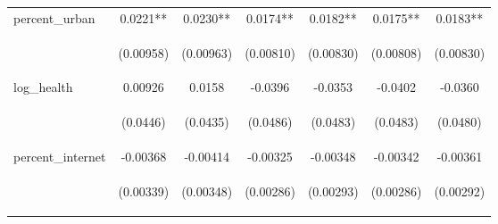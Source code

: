 \documentclass{article}
\begin{document}
\begin{table}[htbp]
{\begin{tabular}{lcccccc}
percent\_urban & 0.0221** & 0.0230** & 0.0174** & 0.0182** & 0.0175** & 0.0183** \\
\vspace{4pt} & \begin{footnotesize}(0.00958)\end{footnotesize} & \begin{footnotesize}(0.00963)\end{footnotesize} & \begin{footnotesize}(0.00810)\end{footnotesize} & \begin{footnotesize}(0.00830)\end{footnotesize} & \begin{footnotesize}(0.00808)\end{footnotesize} & \begin{footnotesize}(0.00830)\end{footnotesize} \\
log\_health & 0.00926 & 0.0158 & -0.0396 & -0.0353 & -0.0402 & -0.0360 \\
\vspace{4pt} & \begin{footnotesize}(0.0446)\end{footnotesize} & \begin{footnotesize}(0.0435)\end{footnotesize} & \begin{footnotesize}(0.0486)\end{footnotesize} & \begin{footnotesize}(0.0483)\end{footnotesize} & \begin{footnotesize}(0.0483)\end{footnotesize} & \begin{footnotesize}(0.0480)\end{footnotesize} \\
percent\_internet & -0.00368 & -0.00414 & -0.00325 & -0.00348 & -0.00342 & -0.00361 \\
\vspace{4pt} & \begin{footnotesize}(0.00339)\end{footnotesize} & \begin{footnotesize}(0.00348)\end{footnotesize} & \begin{footnotesize}(0.00286)\end{footnotesize} & \begin{footnotesize}(0.00293)\end{footnotesize} & \begin{footnotesize}(0.00286)\end{footnotesize} & \begin{footnotesize}(0.00292)\end{footnotesize} \\

\end{tabular}}
\end{table}
\end{document}
